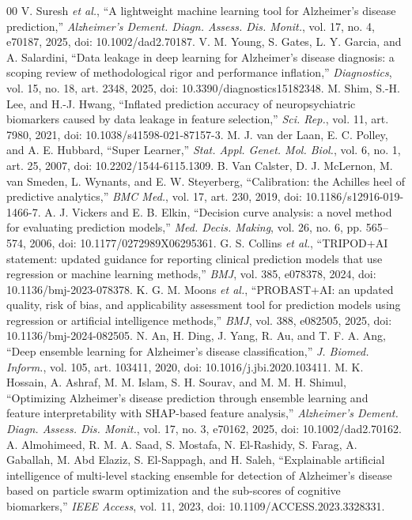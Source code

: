 \documentclass[conference]{IEEEtran}
\begin{document}
\begin{thebibliography}{00}
 V. Suresh \textit{et al.}, ``A lightweight machine learning tool for Alzheimer's disease prediction,'' \textit{Alzheimer's Dement. Diagn. Assess. Dis. Monit.}, vol. 17, no. 4, e70187, 2025, doi: 10.1002/dad2.70187.
 V. M. Young, S. Gates, L. Y. Garcia, and A. Salardini, ``Data leakage in deep learning for Alzheimer's disease diagnosis: a scoping review of methodological rigor and performance inflation,'' \textit{Diagnostics}, vol. 15, no. 18, art. 2348, 2025, doi: 10.3390/diagnostics15182348.
 M. Shim, S.-H. Lee, and H.-J. Hwang, ``Inflated prediction accuracy of neuropsychiatric biomarkers caused by data leakage in feature selection,'' \textit{Sci. Rep.}, vol. 11, art. 7980, 2021, doi: 10.1038/s41598-021-87157-3.
 M. J. van der Laan, E. C. Polley, and A. E. Hubbard, ``Super Learner,'' \textit{Stat. Appl. Genet. Mol. Biol.}, vol. 6, no. 1, art. 25, 2007, doi: 10.2202/1544-6115.1309.
 B. Van Calster, D. J. McLernon, M. van Smeden, L. Wynants, and E. W. Steyerberg, ``Calibration: the Achilles heel of predictive analytics,'' \textit{BMC Med.}, vol. 17, art. 230, 2019, doi: 10.1186/s12916-019-1466-7.
 A. J. Vickers and E. B. Elkin, ``Decision curve analysis: a novel method for evaluating prediction models,'' \textit{Med. Decis. Making}, vol. 26, no. 6, pp. 565--574, 2006, doi: 10.1177/0272989X06295361.
 G. S. Collins \textit{et al.}, ``TRIPOD+AI statement: updated guidance for reporting clinical prediction models that use regression or machine learning methods,'' \textit{BMJ}, vol. 385, e078378, 2024, doi: 10.1136/bmj-2023-078378.
 K. G. M. Moons \textit{et al.}, ``PROBAST+AI: an updated quality, risk of bias, and applicability assessment tool for prediction models using regression or artificial intelligence methods,'' \textit{BMJ}, vol. 388, e082505, 2025, doi: 10.1136/bmj-2024-082505.
 N. An, H. Ding, J. Yang, R. Au, and T. F. A. Ang, ``Deep ensemble learning for Alzheimer's disease classification,'' \textit{J. Biomed. Inform.}, vol. 105, art. 103411, 2020, doi: 10.1016/j.jbi.2020.103411.
 M. K. Hossain, A. Ashraf, M. M. Islam, S. H. Sourav, and M. M. H. Shimul, ``Optimizing Alzheimer's disease prediction through ensemble learning and feature interpretability with SHAP-based feature analysis,'' \textit{Alzheimer's Dement. Diagn. Assess. Dis. Monit.}, vol. 17, no. 3, e70162, 2025, doi: 10.1002/dad2.70162.
 A. Almohimeed, R. M. A. Saad, S. Mostafa, N. El-Rashidy, S. Farag, A. Gaballah, M. Abd Elaziz, S. El-Sappagh, and H. Saleh, ``Explainable artificial intelligence of multi-level stacking ensemble for detection of Alzheimer's disease based on particle swarm optimization and the sub-scores of cognitive biomarkers,'' \textit{IEEE Access}, vol. 11, 2023, doi: 10.1109/ACCESS.2023.3328331.

\end{thebibliography}
\end{document}
